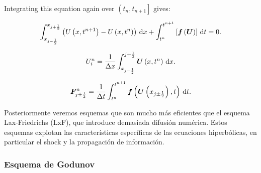\begin{frame}
	Integrating this equation again over
	\begin{math}
		\left(
		t_{n},
		t_{n+1}
		\right]
	\end{math}
	gives:

	\begin{equation*}
		\int_{
			x_{j-\frac{1}{2}}
		}^{
			x_{j+\frac{1}{2}}
		}
		\left(
		U
		\left(x,t^{n+1}\right)-
		U
		\left(x,t^{n}\right)
		\right)
		\dl x+
		\int_{t^{n}}^{t^{n+1}}
		\left[
			\bm{f}
			\left(\bm{U}\right)
			\right]
		\dl t=
		0.
	\end{equation*}

	\begin{equation*}
		U^{n}_{i}=
		\frac{1}{\Delta x}
		\int_{
			x_{j-\frac{1}{2}}
		}^{
			j+\frac{1}{2}
		}
		\bm{U}
		\left(x,t^{n}\right)
		\dl x.
	\end{equation*}

	\begin{equation*}
		\bm{F}^{n}_{j\pm\frac{1}{2}}=
		\frac{1}{\Delta t}
		\int_{t^{n}}^{t^{n+1}}
		\bm{f}
		\left(\bm{U}\left(x_{j\pm\frac{1}{2}}\right),t\right)
		\dl t.
	\end{equation*}

	Posteriormente veremos esquemas que son mucho más eficientes que el
	esquema Lax-Friedrichs (LxF), que introduce demasiada difusión
	numérica.
	Estos esquemas explotan las características específicas de las
	ecuaciones hiperbólicas, en particular el shock y la propagación de
	información.
\end{frame}

\subsubsection*{Esquema de Godunov}

